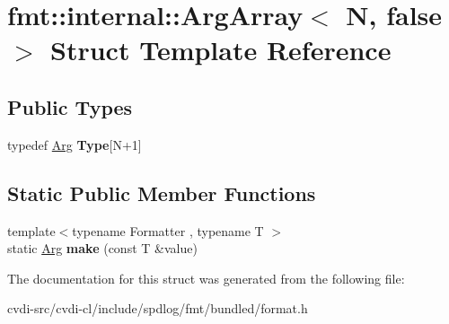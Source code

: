 \hypertarget{structfmt_1_1internal_1_1ArgArray_3_01N_00_01false_01_4}{}\section{fmt\+:\+:internal\+:\+:Arg\+Array$<$ N, false $>$ Struct Template Reference}
\label{structfmt_1_1internal_1_1ArgArray_3_01N_00_01false_01_4}
\subsection*{Public Types}
\begin{DoxyCompactItemize}
\item 
typedef \hyperlink{structfmt_1_1internal_1_1Arg}{Arg} {\bfseries Type}\mbox{[}N+1\mbox{]}\hypertarget{structfmt_1_1internal_1_1ArgArray_3_01N_00_01false_01_4_ab53fffd4174d8cdc70c205ba6dc54b17}{}\label{structfmt_1_1internal_1_1ArgArray_3_01N_00_01false_01_4_ab53fffd4174d8cdc70c205ba6dc54b17}

\end{DoxyCompactItemize}
\subsection*{Static Public Member Functions}
\begin{DoxyCompactItemize}
\item 
{\footnotesize template$<$typename Formatter , typename T $>$ }\\static \hyperlink{structfmt_1_1internal_1_1Arg}{Arg} {\bfseries make} (const T \&value)\hypertarget{structfmt_1_1internal_1_1ArgArray_3_01N_00_01false_01_4_a5052e0376e3deb4bffc5d1a4941bc7c8}{}\label{structfmt_1_1internal_1_1ArgArray_3_01N_00_01false_01_4_a5052e0376e3deb4bffc5d1a4941bc7c8}

\end{DoxyCompactItemize}


The documentation for this struct was generated from the following file\+:\begin{DoxyCompactItemize}
\item 
cvdi-\/src/cvdi-\/cl/include/spdlog/fmt/bundled/format.\+h\end{DoxyCompactItemize}
